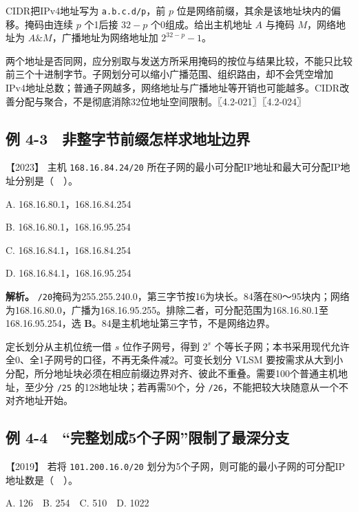 CIDR把IPv4地址写为 \allowbreak{}\texttt{a.b.c.d/p}，前 \(p\) 位是网络前缀，其余是该地址块内的偏移。掩码由连续 \(p\) 个1后接 \(32-p\) 个0组成。给出主机地址 \(A\) 与掩码 \(M\)，网络地址为 \(A\&M\)，广播地址为网络地址加 \(2^{32-p}-1\)。

两个地址是否同网，应分别取与发送方所采用掩码的按位与结果比较，不能只比较前三个十进制字节。子网划分可以缩小广播范围、组织路由，却不会凭空增加IPv4地址总数；普通子网越多，网络地址与广播地址等开销也可能越多。CIDR改善分配与聚合，不是彻底消除32位地址空间限制。〖4.2-021〗〖4.2-024〗

\subsection{例 4-3　非整字节前缀怎样求地址边界}\label{cn-ex4-3}

\noindent{}【2023】 主机 \allowbreak{}\texttt{168.16.84.24/20} 所在子网的最小可分配IP地址和最大可分配IP地址分别是（　）。

A. 168.16.80.1，168.16.84.254

B. 168.16.80.1，168.16.95.254

C. 168.16.84.1，168.16.84.254

D. 168.16.84.1，168.16.95.254


\textbf{解析。} \allowbreak{}\texttt{/20}掩码为255.255.240.0，第三字节按16为块长。84落在80～95块内；网络为168.16.80.0，广播为168.16.95.255。排除二者，可分配范围为168.16.80.1至168.16.95.254，选 \textbf{B}。84是主机地址第三字节，不是网络边界。

定长划分从主机位统一借 \(s\) 位作子网号，得到 \(2^s\) 个等长子网；本书采用现代允许全0、全1子网号的口径，不再无条件减2。可变长划分 VLSM 要按需求从大到小分配，所分地址块必须在相应前缀边界对齐、彼此不重叠。需要100个普通主机地址，至少分 \allowbreak{}\texttt{/25} 的128地址块；若再需50个，分 \allowbreak{}\texttt{/26}，不能把较大块随意从一个不对齐地址开始。

\subsection{例 4-4　``完整划成5个子网''限制了最深分支}\label{cn-ex4-4}

\noindent{}【2019】 若将 \allowbreak{}\texttt{101.200.16.0/20} 划分为5个子网，则可能的最小子网的可分配IP地址数是（　）。

A. 126　B. 254　C. 510　D. 1022


